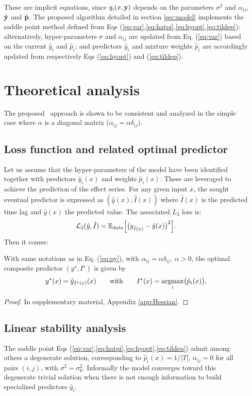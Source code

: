These are implicit equations, since $q_i(x,{\bf y})$ depends on the parameters $\sigma^2$ and $\alpha_{ij}$, $\hat {\bf y}$ and $\hat{\bf p}$.
The proposed algorithm detailed in section \ref{sec:model} implements the saddle point method defined from Eqs (\ref{eq:var},\ref{eq:hatpi},\ref{eq:hyopt},\ref{eq:tildep}): alternatively,  hyper-parameters $\sigma$ and $\alpha_{ij}$ are updated from Eq. (\ref{eq:var}) based on the current $\hat y_i$ and $\hat p_i$; and predictors $\hat y_i$ and mixture weights  $\hat p_i$ are accordingly updated from respectively Eqs (\ref{eq:hyopt}) and (\ref{eq:tildep}). 

\section{Theoretical analysis}\label{sec-theory}
The proposed \XX\ approach is shown to be consistent and analyzed in the simple case  where $\alpha$ is a diagonal matrix ($\alpha_{ij} = \alpha\delta_{ij}$).

\subsection{Loss function and related optimal predictor}\label{sec:prop}
Let us assume that the hyper-parameters of the model have been identified together with predictors $\hat  y_i(x)$ and weights $\hat p_i(x)$. These are leveraged to achieve the prediction of the effect series. 
For any given input $x$, the sought eventual predictor is expressed as $(\hat y(x),\hat I(x))$ where $\hat I(x)$ is the predicted time lag %
and $\hat y(x)$ the 
predicted value. The associated $L_2$ loss is: 
\begin{equation}\label{eq:orloss}
{\cal L}_2(\hat y,\hat I) = {\mathbb E}_{data}\Bigl[\bigl(y_{\hat I(x)}-\hat y(x)\bigr)^2\Bigr]. 
\end{equation}
Then it comes:
\begin{prop}\label{prop:opred}
With same notations as in Eq. (\ref{eq:py}), with $\alpha_{ij} = \alpha\delta_{ij},\ \alpha>0$, the optimal composite predictor 
$(y^\star,I^\star)$ is given by
\[
y^\star(x) = \hat y_{I^\star(x)}(x)\qquad\text{with}\qquad I^\star(x) = \operatorname*{argmax}_{i} \bigl(\hat p_i(x)\bigr), 
\]
\end{prop}
\begin{proof}
In supplementary material, Appendix \ref{app:Hessian}.
\end{proof}

\subsection{Linear stability analysis}\label{sec:stability}
The saddle point Eqs (\ref{eq:var},\ref{eq:hatpi},\ref{eq:hyopt},\ref{eq:tildep}) admit among others a degenerate solution, corresponding 
to $\hat p_i(x) = 1/\vert T\vert$, $\alpha_{ij}=0$ for all pairs $(i,j)$, with $\sigma^2=\sigma_0^2$. Informally the model converges toward this degenerate trivial solution when there is not enough information to build specialized predictors $\hat y_i$. 

